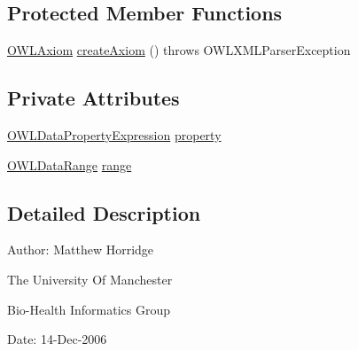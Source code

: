 \subsection*{Protected Member Functions}
\begin{DoxyCompactItemize}
\item 
\hyperlink{interfaceorg_1_1semanticweb_1_1owlapi_1_1model_1_1_o_w_l_axiom}{O\-W\-L\-Axiom} \hyperlink{classorg_1_1coode_1_1owlapi_1_1owlxmlparser_1_1_o_w_l_data_property_range_axiom_element_handler_ae603507cd9904cd82f54b174a70a0c81}{create\-Axiom} ()  throws O\-W\-L\-X\-M\-L\-Parser\-Exception 
\end{DoxyCompactItemize}
\subsection*{Private Attributes}
\begin{DoxyCompactItemize}
\item 
\hyperlink{interfaceorg_1_1semanticweb_1_1owlapi_1_1model_1_1_o_w_l_data_property_expression}{O\-W\-L\-Data\-Property\-Expression} \hyperlink{classorg_1_1coode_1_1owlapi_1_1owlxmlparser_1_1_o_w_l_data_property_range_axiom_element_handler_a2fb2a0635770f381a3e8e465d64d89f0}{property}
\item 
\hyperlink{interfaceorg_1_1semanticweb_1_1owlapi_1_1model_1_1_o_w_l_data_range}{O\-W\-L\-Data\-Range} \hyperlink{classorg_1_1coode_1_1owlapi_1_1owlxmlparser_1_1_o_w_l_data_property_range_axiom_element_handler_a09c6699d794a7fbc17c676acf0a77079}{range}
\end{DoxyCompactItemize}


\subsection{Detailed Description}
Author\-: Matthew Horridge\par
 The University Of Manchester\par
 Bio-\/\-Health Informatics Group\par
 Date\-: 14-\/\-Dec-\/2006\par
\par
 

